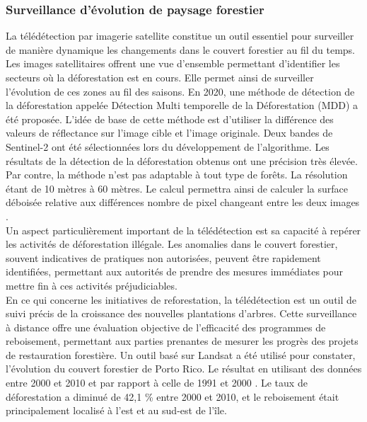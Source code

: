 \subsubsection{Surveillance d’évolution de paysage forestier}
La télédétection par imagerie satellite constitue un outil essentiel pour surveiller de manière dynamique les changements dans le couvert forestier au fil du temps. Les images satellitaires offrent une vue d'ensemble permettant d'identifier les secteurs où la déforestation est en cours. Elle permet ainsi de surveiller l'évolution de ces zones au fil des saisons. En 2020, une méthode de détection de la déforestation appelée Détection Multi temporelle de la Déforestation (MDD) a été proposée. L'idée de base de cette méthode est d'utiliser la différence des valeurs de réflectance sur l'image cible et l'image originale. Deux bandes de Sentinel-2 ont été sélectionnées lors du développement de l'algorithme. Les résultats de la détection de la déforestation obtenus ont une précision très élevée. Par contre, la méthode n’est pas adaptable à tout type de forêts. La résolution étant de 10 mètres à 60 mètres. Le calcul permettra ainsi de calculer la surface déboisée relative aux différences nombre de pixel changeant entre les deux images \cite{35}.
\\

Un aspect particulièrement important de la télédétection est sa capacité à repérer les activités de déforestation illégale. Les anomalies dans le couvert forestier, souvent indicatives de pratiques non autorisées, peuvent être rapidement identifiées, permettant aux autorités de prendre des mesures immédiates pour mettre fin à ces activités préjudiciables. 
\\

En ce qui concerne les initiatives de reforestation, la télédétection est un outil de suivi précis de la croissance des nouvelles plantations d'arbres. Cette surveillance à distance offre une évaluation objective de l'efficacité des programmes de reboisement, permettant aux parties prenantes de mesurer les progrès des projets de restauration forestière. Un outil basé sur Landsat a été utilisé pour constater, l’évolution du couvert forestier de Porto Rico. Le résultat en utilisant des données entre 2000 et 2010 et par rapport à celle de 1991 et 2000 \cite{36}. Le taux de déforestation a diminué de 42,1 \% entre 2000 et 2010, et le reboisement était principalement localisé à l'est et au sud-est de l'île. 


